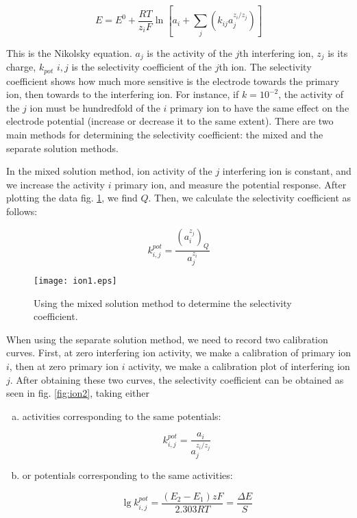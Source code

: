 \begin{equation}
\label{eq:nikolsky}
E=E^0 + \frac{RT}{z_iF} \ln \left [ a_i + \sum_{j} \left ( k_{ij}a_j^{z_i/z_j} \right ) \right ]
\end{equation}

This is the Nikolsky equation. $a_j$ is the activity of the $j$th interfering ion, $z_j$ is its charge, $k_{pot}$ $i, j$ is the selectivity coefficient of the $j$th ion.
The selectivity coefficient shows how much more sensitive is the electrode towards the primary ion, then towards to the interfering ion.
For instance, if $k = 10^{-2}$, the activity of the $j$ ion must be hundredfold of the $i$ primary ion to have the same effect on the electrode potential (increase or decrease it to the same extent).
There are two main methods for determining the selectivity coefficient: the mixed and the separate solution methods.

In the mixed solution method, ion activity of the $j$ interfering ion is constant, and we increase the activity $i$ primary ion, and measure the potential response.
After plotting the data fig. \ref{fig:Q}, we find $Q$. Then, we calculate the selectivity coefficient as follows:

\begin{equation}
\label{eq:szel1}
	k_{i,j}^{pot}
	=
	\frac{(a_i^{z_j})_Q}{a_j^{z_i}}
\end{equation}


\begin{figure}
\centering
\texttt{[image: ion1.eps]}
\caption{Using the mixed solution method to determine the selectivity coefficient.}
\label{fig:Q}
\end{figure}

When using the separate solution method, we need to record two calibration curves.
First, at zero interfering ion activity, we make a calibration of primary ion $i$, then at zero primary ion $i$ activity, we make a calibration plot of interfering ion $j$.
After obtaining these two curves, the selectivity coefficient can be obtained as seen in fig. \ref{fig:ion2}, taking either

\begin{enumerate}[(a)]
\item activities corresponding to the same potentials:

\begin{equation}
\label{eq:azonospot}
        k_{i,j}^{pot}
        =
        \frac{a_i}{a_j^{z_i/z_j}}
\end{equation}

\item or potentials corresponding to the same activities:

\begin{equation}
\label{eq:azonosakt}
        \lg k_{i,j}^{pot}
        =
        \frac{(E_2-E_1)zF}{2.303RT}
	=
	\frac{\Delta E}{S}
\end{equation}

\end{enumerate}

